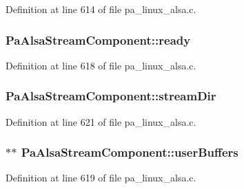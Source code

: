 Definition at line 614 of file pa\+\_\+linux\+\_\+alsa.\+c.

\subsubsection[{\texorpdfstring{ready}{ready}}]{ Pa\+Alsa\+Stream\+Component\+::ready}\hypertarget{struct_pa_alsa_stream_component_af0dc1dc7181a8e310995efd0c4f1d44c}{}\label{struct_pa_alsa_stream_component_af0dc1dc7181a8e310995efd0c4f1d44c}


Definition at line 618 of file pa\+\_\+linux\+\_\+alsa.\+c.

\subsubsection[{\texorpdfstring{stream\+Dir}{streamDir}}]{ Pa\+Alsa\+Stream\+Component\+::stream\+Dir}\hypertarget{struct_pa_alsa_stream_component_a68200bf1c2218a02b34799956fe337a7}{}\label{struct_pa_alsa_stream_component_a68200bf1c2218a02b34799956fe337a7}


Definition at line 621 of file pa\+\_\+linux\+\_\+alsa.\+c.

\subsubsection[{\texorpdfstring{user\+Buffers}{userBuffers}}]{$\ast$$\ast$ Pa\+Alsa\+Stream\+Component\+::user\+Buffers}\hypertarget{struct_pa_alsa_stream_component_a0c248f3409a0a73fbd641e1be0d71277}{}\label{struct_pa_alsa_stream_component_a0c248f3409a0a73fbd641e1be0d71277}


Definition at line 619 of file pa\+\_\+linux\+\_\+alsa.\+c.

